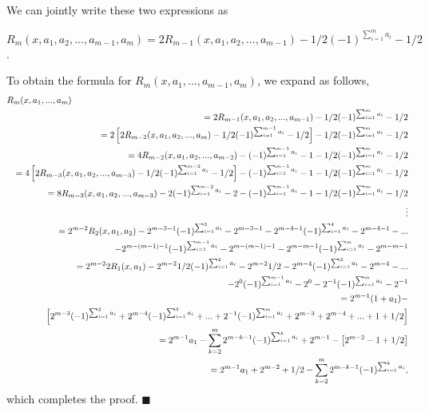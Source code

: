 \documentclass[12pt]{article} \pagestyle{plain} \topmargin
\begin{document}
We can jointly write these two expressions as

$R_m(x,a_1,a_2,...,a_{m-1},a_m)=2R_{m-1}(x,a_1,a_2,...,a_{m-1})-1/2(-1)^{\sum_{i=1}^m
a_i}-1/2$.


To obtain the formula for $R_m(x,a_1,...,a_{m-1},a_m)$, we expand as
follows,
\begin{eqnarray*}
\lefteqn{R_m(x,a_1,...,a_m)}  \\
& & =  2R_{m-1}(x,a_1,a_2,...,a_{m-1})-1/2(-1)^{\sum_{i=1}^ma_i}-1/2\\
& & =  2\left[2R_{m-2}(x,a_1,a_2,...,a_m)-1/2(-1)^{\sum_{i=1}^{m-1}a_i}-1/2\right]-1/2(-1)^{\sum_{i=1}^ma_i}-1/2\\
              &  & =  4R_{m-2}(x,a_1,a_2,...,a_{m-2})-(-1)^{\sum_{i=1}^{m-1} a_i}-1-1/2(-1)^{\sum_{i=1}^ma_i}-1/2\\
                       &  & =  4\left[2R_{m-3}(x,a_1,a_2,...,a_{m-3})-1/2(-1)^{\sum_{i=1}^{m-2} a_i}-1/2\right]-(-1)^{\sum_{i=1}^{m-1} a_i}-1-1/2(-1)^{\sum_{i=1}^ma_i}-1/2\\
                       &  & =  8R_{m-3}(x,a_1,a_2,...,a_{m-3})-2(-1)^{\sum_{i=1}^{m-2}
                       a_i}-2-(-1)^{\sum_{i=1}^{m-1}
                       a_i}-1-1/2(-1)^{\sum_{i=1}^ma_i}-1/2\\
                       &  & \vdots\\
                       &  & =  2^{m-2}R_2(x,a_1,a_2)-2^{m-3-1}(-1)^{\sum_{i=1}^3 a_i}-2^{m-3-1}-2^{m-4-1}(-1)^{\sum_{i=1}^4 a_i}-2^{m-4-1}-...\\
                       &  &  \hspace{0.2in}-2^{m-(m-1)-1}(-1)^{\sum_{i=1}^{m-1} a_i}-2^{m-(m-1)-1}-2^{m-m-1}(-1)^{\sum_{i=1}^m a_i}-2^{m-m-1}\\
                       &  & =  2^{m-2}2R_1(x,a_1)-2^{m-2}1/2(-1)^{\sum_{i=1}^2 a_i}-2^{m-2}1/2-2^{m-4}(-1)^{\sum_{i=1}^3 a_i}-2^{m-4}-...\\
                       &  &  \hspace{0.2in}-2^0(-1)^{\sum_{i=1}^{m-1} a_i}-2^0-2^{-1}(-1)^{\sum_{i=1}^m a_i}-2^{-1}\\
                       &  & = 2^{m-1}(1+a_1)-\\
                       &  & \left[2^{m-3}(-1)^{\sum_{i=1}^2 a_i}+2^{m-4}(-1)^{\sum_{i=1}^3 a_i}+...+2^{-1}(-1)^{\sum_{i=1}^m a_i}+2^{m-3}+2^{m-4}+...+1+1/2 \right]\\
                       &  & = 2^{m-1}a_1-\sum_{k=2}^m 2^{m-k-1}(-1)^{\sum_{i=1}^k
                       a_i}+2^{m-1}-\left[2^{m-2}-1+1/2\right]\\
                       &  & =
                       2^{m-1}a_1+2^{m-2}+1/2-\sum_{k=2}^m2^{m-k-1}(-1)^{\sum_{i=1}^ka_i},
\end{eqnarray*}
which completes the proof. \hfill $\blacksquare$
\end{document}
